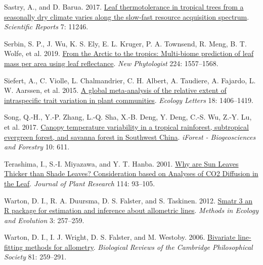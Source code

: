 \documentclass[
  12pt,
  a4paper,
,tablecaptionabove
]{scrartcl}
\newlength{\cslhangindent}
\newenvironment{CSLReferences}[2] %
 {%
  \setlength{\parindent}{0pt}
  \ifodd #1 \everypar{\setlength{\hangindent}{\cslhangindent}}\ignorespaces\fi
  \ifnum #2 > 0
  \setlength{\parskip}{#2\baselineskip}
  \fi
 }%
 {}
\begin{document}
\begin{CSLReferences}{1}{0}
\leavevmode{}%
Sastry, A., and D. Barua. 2017. \href{https://doi.org/10.1038/s41598-017-11343-5}{Leaf thermotolerance in tropical trees from a seasonally dry climate varies along the slow-fast resource acquisition spectrum}. \emph{Scientific Reports} 7: 11246.

\leavevmode{}%
Serbin, S. P., J. Wu, K. S. Ely, E. L. Kruger, P. A. Townsend, R. Meng, B. T. Wolfe, et al. 2019. \href{https://doi.org/10.1111/nph.16123}{From the {Arctic} to the tropics: Multi-biome prediction of leaf mass per area using leaf reflectance}. \emph{New Phytologist} 224: 1557--1568.

\leavevmode{}%
Siefert, A., C. Violle, L. Chalmandrier, C. H. Albert, A. Taudiere, A. Fajardo, L. W. Aarssen, et al. 2015. \href{https://doi.org/10.1111/ele.12508}{A global meta-analysis of the relative extent of intraspecific trait variation in plant communities}. \emph{Ecology Letters} 18: 1406--1419.

\leavevmode{}%
Song, Q.-H., Y.-P. Zhang, L.-Q. Sha, X.-B. Deng, Y. Deng, C.-S. Wu, Z.-Y. Lu, et al. 2017. \href{https://doi.org/10.3832/ifor2223-010}{Canopy temperature variability in a tropical rainforest, subtropical evergreen forest, and savanna forest in {Southwest China}}. \emph{iForest - Biogeosciences and Forestry} 10: 611.

\leavevmode{}%
Terashima, I., S.-I. Miyazawa, and Y. T. Hanba. 2001. \href{https://doi.org/10.1007/PL00013972}{Why are {Sun Leaves Thicker} than {Shade Leaves}? \textemdash{} {Consideration} based on {Analyses} of {CO2 Diffusion} in the {Leaf}}. \emph{Journal of Plant Research} 114: 93--105.

\leavevmode{}%
Warton, D. I., R. A. Duursma, D. S. Falster, and S. Taskinen. 2012. \href{https://doi.org/10.1111/j.2041-210X.2011.00153.x}{Smatr 3\textendash{} an {R} package for estimation and inference about allometric lines}. \emph{Methods in Ecology and Evolution} 3: 257--259.

\leavevmode{}%
Warton, D. I., I. J. Wright, D. S. Falster, and M. Westoby. 2006. \href{https://doi.org/10.1017/S1464793106007007}{Bivariate line-fitting methods for allometry}. \emph{Biological Reviews of the Cambridge Philosophical Society} 81: 259--291.


\end{CSLReferences}
\end{document}
